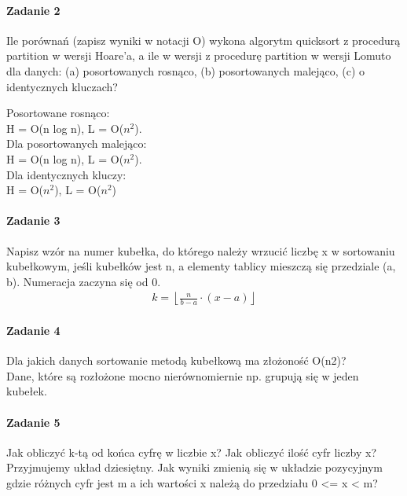 \documentclass[18pt]{extarticle}
\begin{document}
\paragraph{Zadanie 2} Ile porównań (zapisz wyniki w notacji O) wykona algorytm quicksort z procedurą partition w wersji Hoare'a, a ile w wersji z procedurę partition w wersji Lomuto dla danych: (a) posortowanych rosnąco, (b) posortowanych malejąco, (c) o identycznych kluczach?
\begin{multicols}{3}
Posortowane rosnąco: \\
H = O(n log n), L = O($n^2$). \\

\columnbreak
Dla posortowanych malejąco: \\
H = O(n log n), L = O($n^2$). \\

\columnbreak
Dla identycznych kluczy: \\
H = O($n^2$), L = O($n^2$) \\ 
\end{multicols}

\paragraph{Zadanie 3} Napisz wzór na numer kubełka, do którego należy wrzucić liczbę x w sortowaniu kubełkowym, jeśli kubełków jest n, a elementy tablicy mieszczą się przedziale (a, b). Numeracja zaczyna się od 0. \\


\begin{align*}
    k = \left \lfloor \frac{n}{b - a} \cdot (x - a) \right \rfloor
\end{align*}

\paragraph{Zadanie 4} Dla jakich danych sortowanie metodą kubełkową ma złożoność O(n2)? \\


Dane, które są rozłożone mocno nierównomiernie np. grupują się w jeden kubełek.

\paragraph{Zadanie 5} Jak obliczyć k-tą od końca cyfrę w liczbie x? Jak obliczyć ilość cyfr liczby x? Przyjmujemy układ dziesiętny. Jak wyniki zmienią się w układzie pozycyjnym gdzie różnych cyfr jest m a ich wartości x należą do przedziału 0 <= x < m?
\end{document}
